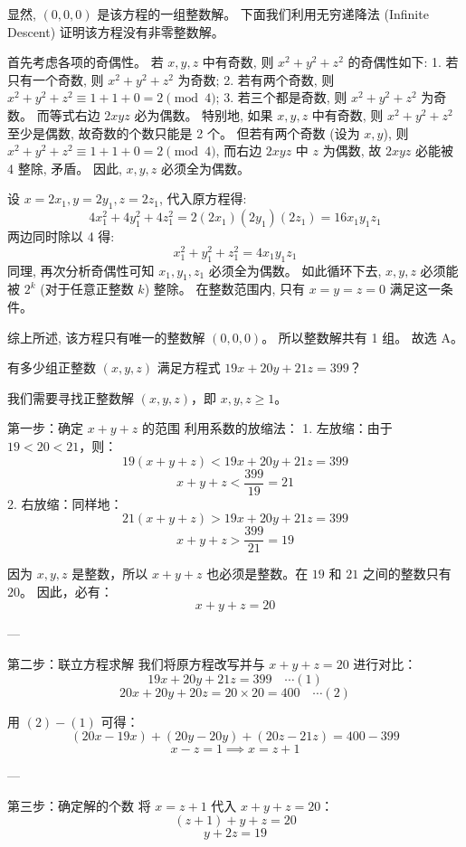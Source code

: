 \begin{questions}
\begin{solution}
显然, $(0, 0, 0)$ 是该方程的一组整数解。
下面我们利用无穷递降法 (Infinite Descent) 证明该方程没有非零整数解。

首先考虑各项的奇偶性。
若 $x, y, z$ 中有奇数, 则 $x^2 + y^2 + z^2$ 的奇偶性如下:
1. 若只有一个奇数, 则 $x^2 + y^2 + z^2$ 为奇数;
2. 若有两个奇数, 则 $x^2 + y^2 + z^2 \equiv 1 + 1 + 0 = 2 \pmod 4$;
3. 若三个都是奇数, 则 $x^2 + y^2 + z^2$ 为奇数。
而等式右边 $2xyz$ 必为偶数。
特别地, 如果 $x, y, z$ 中有奇数, 则 $x^2 + y^2 + z^2$ 至少是偶数, 故奇数的个数只能是 2 个。
但若有两个奇数 (设为 $x, y$), 则 $x^2 + y^2 + z^2 \equiv 1 + 1 + 0 = 2 \pmod 4$, 而右边 $2xyz$ 中 $z$ 为偶数, 故 $2xyz$ 必能被 4 整除, 矛盾。
因此, $x, y, z$ 必须全为偶数。

设 $x = 2x_1, y = 2y_1, z = 2z_1$, 代入原方程得:
\[
4x_1^2 + 4y_1^2 + 4z_1^2 = 2(2x_1)(2y_1)(2z_1) = 16x_1y_1z_1
\]
两边同时除以 4 得:
\[
x_1^2 + y_1^2 + z_1^2 = 4x_1y_1z_1
\]
同理, 再次分析奇偶性可知 $x_1, y_1, z_1$ 必须全为偶数。
如此循环下去, $x, y, z$ 必须能被 $2^k$ (对于任意正整数 $k$) 整除。
在整数范围内, 只有 $x = y = z = 0$ 满足这一条件。

综上所述, 该方程只有唯一的整数解 $(0, 0, 0)$。
所以整数解共有 1 组。
故选 A。
\end{solution}

\question
有多少组正整数 $(x, y, z)$ 满足方程式 $19x + 20y + 21z = 399$？

\begin{solution}
我们需要寻找正整数解 $(x, y, z)$，即 $x, y, z \ge 1$。

 第一步：确定 $x+y+z$ 的范围
利用系数的放缩法：
1. 左放缩：由于 $19 < 20 < 21$，则：
   \[ 19(x + y + z) < 19x + 20y + 21z = 399 \]
   \[ x + y + z < \frac{399}{19} = 21 \]
2. 右放缩：同样地：
   \[ 21(x + y + z) > 19x + 20y + 21z = 399 \]
   \[ x + y + z > \frac{399}{21} = 19 \]

因为 $x, y, z$ 是整数，所以 $x + y + z$ 也必须是整数。在 $19$ 和 $21$ 之间的整数只有 $20$。
因此，必有：
\[ x + y + z = 20 \]

---

 第二步：联立方程求解
我们将原方程改写并与 $x + y + z = 20$ 进行对比：
\[ 19x + 20y + 21z = 399 \quad \cdots (1) \]
\[ 20x + 20y + 20z = 20 \times 20 = 400 \quad \cdots (2) \]

用 $(2) - (1)$ 可得：
\[ (20x - 19x) + (20y - 20y) + (20z - 21z) = 400 - 399 \]
\[ x - z = 1 \implies x = z + 1 \]

---

第三步：确定解的个数
将 $x = z + 1$ 代入 $x + y + z = 20$：
\[ (z + 1) + y + z = 20 \]
\[ y + 2z = 19 \]


\end{solution}
\end{questions}
